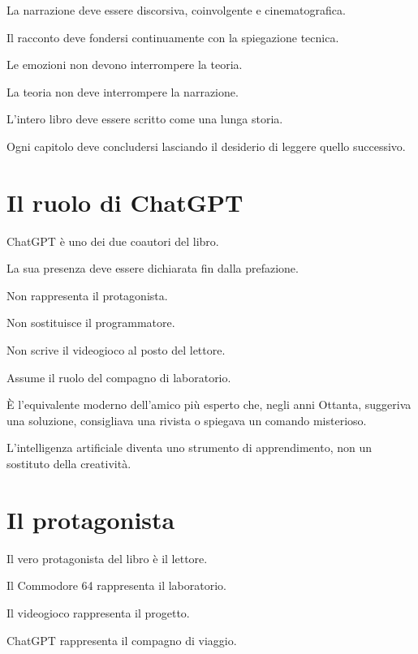\documentclass{article}
\begin{document}
La narrazione deve essere discorsiva, coinvolgente e cinematografica.

Il racconto deve fondersi continuamente con la spiegazione tecnica.

Le emozioni non devono interrompere la teoria.

La teoria non deve interrompere la narrazione.

L'intero libro deve essere scritto come una lunga storia.

Ogni capitolo deve concludersi lasciando il desiderio di leggere quello successivo.



\section{Il ruolo di ChatGPT}
ChatGPT è uno dei due coautori del libro.

La sua presenza deve essere dichiarata fin dalla prefazione.

Non rappresenta il protagonista.

Non sostituisce il programmatore.

Non scrive il videogioco al posto del lettore.

Assume il ruolo del compagno di laboratorio.

È l'equivalente moderno dell'amico più esperto che, negli anni Ottanta, suggeriva una soluzione, consigliava una rivista
o spiegava un comando misterioso.

L'intelligenza artificiale diventa uno strumento di apprendimento, non un sostituto della creatività.



\section{Il protagonista}
Il vero protagonista del libro è il lettore.

Il Commodore 64 rappresenta il laboratorio.

Il videogioco rappresenta il progetto.

ChatGPT rappresenta il compagno di viaggio.
\end{document}
